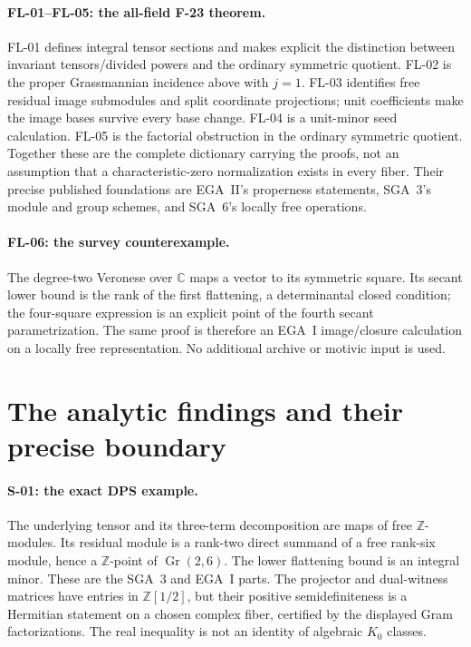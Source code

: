 \paragraph{FL-01--FL-05: the all-field F-23 theorem.}
FL-01 defines integral tensor sections and makes explicit
the distinction between invariant tensors/divided powers
and the ordinary symmetric quotient. FL-02 is the
proper Grassmannian incidence above with $j=1$.
FL-03 identifies free residual image submodules and
split coordinate projections; unit coefficients
make the image bases survive every base change.
FL-04 is a unit-minor seed calculation. FL-05 is
the factorial obstruction in the ordinary symmetric
quotient. Together these are the complete dictionary
carrying the proofs, not an assumption that a
characteristic-zero normalization exists in every
fiber. Their precise published foundations are
EGA~II's properness statements, SGA~3's module and
group schemes, and SGA~6's locally free operations.

\paragraph{FL-06: the survey counterexample.}
The degree-two Veronese over $\mathbb C$ maps a vector
to its symmetric square. Its secant lower bound is
the rank of the first flattening, a determinantal
closed condition; the four-square expression is an
explicit point of the fourth secant parametrization.
The same proof is therefore an EGA~I image/closure
calculation on a locally free representation. No
additional archive or motivic input is used.

\section{The analytic findings and their precise boundary}

\paragraph{S-01: the exact DPS example.}
The underlying tensor and its three-term decomposition
are maps of free $\mathbb Z$-modules. Its residual
module is a rank-two direct summand of a free rank-six
module, hence a $\mathbb Z$-point of
$\operatorname{Gr}(2,6)$. The lower flattening bound
is an integral minor. These are the SGA~3 and EGA~I
parts. The projector and dual-witness matrices have
entries in $\mathbb Z[1/2]$, but their positive
semidefiniteness is a Hermitian statement on a chosen
complex fiber, certified by the displayed Gram
factorizations. The real inequality is not an
identity of algebraic $K_0$ classes.

